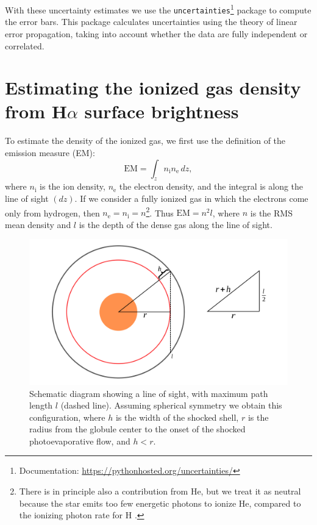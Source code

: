 \documentclass{book}
\begin{document}
With these uncertainty estimates we use the
\verb|uncertainties|\footnote{Documentation:
  \url{https://pythonhosted.org/uncertainties/}} package to compute
the error bars. This package calculates uncertainties using the theory
of linear error propagation, taking into account whether the data are
fully independent or correlated.

\section[\boldmath Estimating the ionized gas density from H$\alpha$
  surface brightness]{Estimating the ionized gas density from
  H$\alpha$ surface brightness}\label{Sec : estimacion de densidad}

To estimate the density of the ionized gas, we first use the
definition of the emission measure (EM):
\begin{equation}
\mathrm{EM}=\int_z n_\mathrm{i} n_\mathrm{e}\,dz,
\end{equation}
where $n_\mathrm{i}$ is the ion density, $n_\mathrm{e}$ the electron
density, and the integral is along the line of sight $(dz)$. If we
consider a fully ionized gas in which the electrons come only from
hydrogen, then $n_\mathrm{e}=n_\mathrm{i}=n$\footnote{There is in
  principle also a contribution from He, but we treat it as neutral
  because the star emits too few energetic photons to ionize He,
  compared to the ionizing photon rate for H
  \citep{Palmira:2020}.}. Thus $\mathrm{EM}=n^2 l$, where $n$ is the
RMS mean density and $l$ is the depth of the dense gas along the line
of sight.

\begin{figure}[htb]
    \centering
    \includegraphics[width=\textwidth]{artesanales/ImgFi01-4.pdf}
    \caption{Schematic diagram showing a line of sight, with maximum
      path length $l$ (dashed line). Assuming spherical symmetry we
      obtain this configuration, where $h$ is the width of the shocked
      shell, $r$ is the radius from the globule center to the onset of
      the shocked photoevaporative flow, and $h<r$.}
    \label{fig:EM}
\end{figure}
\end{document}
